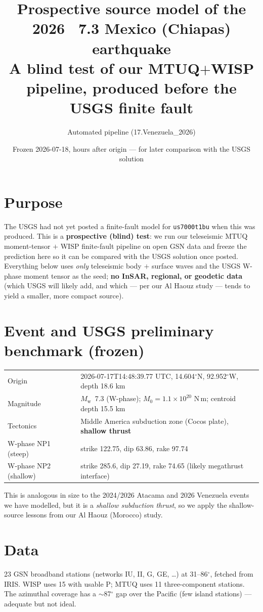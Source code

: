 \documentclass[11pt]{article}
\title{\textbf{Prospective source model of the 2026 \Mw~7.3 Mexico (Chiapas) earthquake}\\
\large A blind test of our MTUQ$+$WISP pipeline, produced before the USGS finite fault}
\author{Automated pipeline (17.Venezuela\_2026)}
\date{Frozen 2026-07-18, hours after origin --- for later comparison with the USGS solution}
\newcommand{\Mw}{$M_{\mathrm w}$}
\begin{document}
\maketitle

\section*{Purpose}
The USGS had not yet posted a finite-fault model for \texttt{us7000t1bu} when this was produced.
This is a \textbf{prospective (blind) test}: we run our teleseismic MTUQ moment-tensor $+$ WISP
finite-fault pipeline on open GSN data and freeze the prediction here so it can be compared with the
USGS solution once posted. Everything below uses \emph{only} teleseismic body $+$ surface waves and
the USGS W-phase moment tensor as the seed; \textbf{no InSAR, regional, or geodetic data} (which
USGS will likely add, and which --- per our Al Haouz study --- tends to yield a smaller, more
compact source).

\section{Event and USGS preliminary benchmark (frozen)}
\begin{table}[H]\centering\small
\begin{tabular}{ll}
\toprule
Origin & 2026-07-17T14:48:39.77 UTC, 14.604$^\circ$N, 92.952$^\circ$W, depth 18.6 km \\
Magnitude & \Mw~7.3 (W-phase); $M_0 = 1.1\times10^{20}$ N\,m; centroid depth 15.5 km \\
Tectonics & Middle America subduction zone (Cocos plate), \textbf{shallow thrust} \\
W-phase NP1 (steep) & strike 122.75, dip 63.86, rake 97.74 \\
W-phase NP2 (shallow) & strike 285.6, dip 27.19, rake 74.65 \quad(likely megathrust interface) \\
\bottomrule
\end{tabular}
\end{table}

This is analogous in size to the 2024/2026 Atacama and 2026 Venezuela events we have modelled, but
it is a \emph{shallow subduction thrust}, so we apply the shallow-source lessons from our Al Haouz
(Morocco) study.

\section{Data}
23 GSN broadband stations (networks IU, II, G, GE, \ldots) at 31--86$^\circ$, fetched from IRIS.
WISP uses 15 with usable P; MTUQ uses 11 three-component stations. The azimuthal coverage has a
$\sim$87$^\circ$ gap over the Pacific (few island stations) --- adequate but not ideal.
\end{document}
